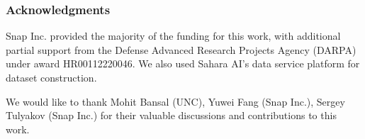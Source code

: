 \subsubsection*{Acknowledgments}
Snap Inc. provided the majority of the funding for this work, with additional partial support from the Defense Advanced Research Projects Agency (DARPA) under award HR00112220046.
We also used Sahara AI’s data service platform for dataset construction.

We would like to thank Mohit Bansal (UNC), Yuwei Fang (Snap Inc.), Sergey Tulyakov (Snap Inc.) for their valuable discussions and contributions to this work.